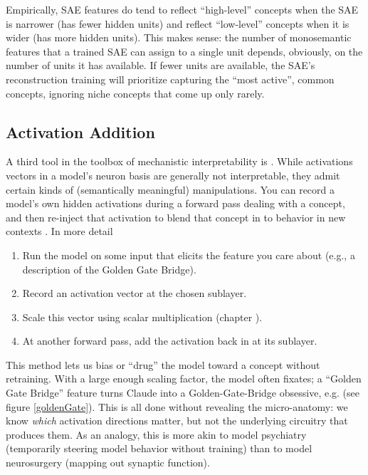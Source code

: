 Empirically, SAE features do tend to reflect ``high-level'' concepts when the
SAE is narrower (has fewer hidden units) and reflect ``low-level'' concepts
when it is wider (has more hidden units). This makes sense: the number of
monosemantic features that a trained SAE can assign to a single unit depends,
obviously, on the number of units it has available. If fewer units are
available, the SAE's reconstruction training will prioritize capturing the
``most active'', common concepts, ignoring niche concepts that come up only
rarely.

\subsection{Activation Addition}

A third tool in the toolbox of mechanistic interpretability is
. While activations vectors in a model's neuron
basis are generally not interpretable, they admit certain kinds of
(semantically meaningful) manipulations. You can record a model's own hidden
activations during a forward pass dealing with a concept, and then re-inject
that activation to blend that concept in to behavior in new contexts
\cite{turner2024activation,zou2025representation}. In more
detail

\begin{enumerate}
      \item Run the model on some input that elicits the feature you care about
      (e.g., a description of the Golden Gate Bridge).
      \item Record an activation vector at the chosen sublayer.
      \item Scale this vector using scalar multiplication (chapter
      ).
      \item At another forward pass, add the activation back in at its sublayer.
 \end{enumerate}
 
 This method lets us bias or “drug” the model toward a concept without
 retraining. With a large enough scaling factor, the model often fixates; a
 ``Golden Gate Bridge'' feature turns Claude into a Golden-Gate-Bridge
 obsessive, e.g. (see figure \ref{goldenGate}). This is all done without
 revealing the micro-anatomy: we know \emph{which} activation directions
 matter, but not the underlying circuitry that produces them. As an analogy,
 this is more akin to model psychiatry (temporarily steering model behavior
 without training) than to model neurosurgery (mapping out synaptic function).
 
